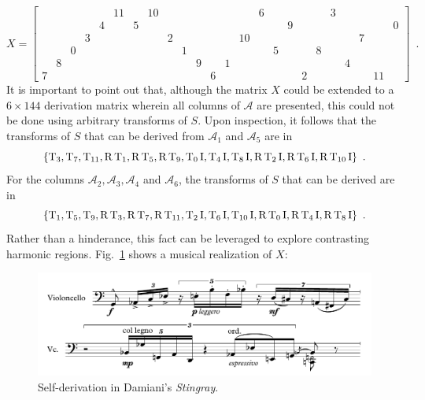 \begin{example}
    \begin{equation}
        X = \left[
        \begin{array}{cccccccccccc|cccccccccccc}
            &&&&& 11 && 10 &&&&&&& 6 &&&&& 3 &&&& \\
            &&&& 4 && 5 &&&&&&&&&& 9 &&&&&&& 0 \\
            &&& 3 &&&&& 2 &&&&& 10 &&&&&&&& 7 && \\
            && 0 &&&&&&& 1 &&&&&& 5 &&& 8 &&&&& \\
            & 8 &&&&&&&&& 9 && 1 &&&&&&&& 4 &&& \\
            7 &&&&&&&&&&& 6 &&&&&& 2 &&&&& 11 &
        \end{array}
        \right] \enspace.
    \end{equation}
    It is important to point out that, although the matrix $X$ could be extended to a $6 \times 144$ derivation matrix wherein all columns of $\mathcal{A}$ are presented, this could not be done using arbitrary transforms of $S$. Upon inspection, it follows that the transforms of $S$ that can be derived from $\mathcal{A}_1$ and $\mathcal{A}_5$ are in
    \begin{equation}
        \{ \operatorname{T}_3, \operatorname{T}_7, \operatorname{T}_{11}, \operatorname{R}\operatorname{T}_1, \operatorname{R}\operatorname{T}_5, \operatorname{R}\operatorname{T}_9, \operatorname{T}_0\operatorname{I}, \operatorname{T}_4\operatorname{I}, \operatorname{T}_8\operatorname{I}, \operatorname{R}\operatorname{T}_2\operatorname{I}, \operatorname{R}\operatorname{T}_6\operatorname{I}, \operatorname{R}\operatorname{T}_{10}\operatorname{I} \} \enspace.
    \end{equation}
    For the columns $\mathcal{A}_2, \mathcal{A}_3, \mathcal{A}_4$ and $\mathcal{A}_6$, the transforms of $S$ that can be derived are in
    \begin{equation}
        \{ \operatorname{T}_1, \operatorname{T}_5, \operatorname{T}_9, \operatorname{R}\operatorname{T}_3, \operatorname{R}\operatorname{T}_7, \operatorname{R}\operatorname{T}_{11}, \operatorname{T}_2\operatorname{I}, \operatorname{T}_6\operatorname{I}, \operatorname{T}_{10}\operatorname{I}, \operatorname{R}\operatorname{T}_0\operatorname{I}, \operatorname{R}\operatorname{T}_4\operatorname{I}, \operatorname{R}\operatorname{T}_8\operatorname{I} \} \enspace.
    \end{equation}
    Rather than a hinderance, this fact can be leveraged to explore contrasting harmonic regions. Fig.~\ref{fig:stingray} shows a musical realization of $X$:
    \begin{figure}[htbp]
        \centering
        \includegraphics[width=6.5in]{figures/stingray-example.pdf}
        \caption[Self-derivation in Damiani's \emph{Stingray}.]{Self-derivation in Damiani's \emph{Stingray}.}
        \label{fig:stingray}
    \end{figure}
\end{example}


